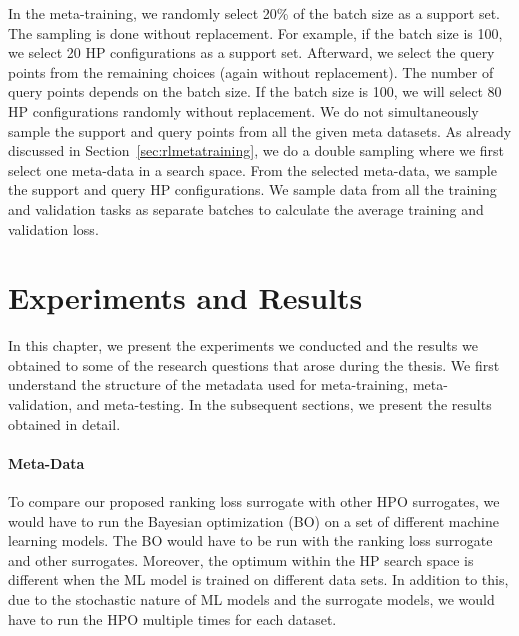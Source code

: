 \documentclass[12pt, twoside, ngerman]{report}
\begin{document}
In the meta-training, we randomly select 20\% of the batch size as a support set. The sampling is done without replacement.
For example, if the batch size is 100, we select 20 HP configurations as a support set.
Afterward,  we select the query points from the remaining choices (again without replacement). The number of query points depends on the batch size. If the batch size is 100, we will select 80 HP configurations randomly without replacement.
We do not simultaneously sample the support and query points from all the given meta datasets.
As already discussed in Section~\ref{sec:rlmetatraining}, we do a double sampling where we first select one meta-data in a search space. From the selected meta-data, we sample the support and query HP configurations.
We sample data from all the training and validation tasks as separate batches to calculate the average training and validation loss.

\chapter{Experiments and Results}
\label{chap:HPOBExplanation}

In this chapter, we present the experiments we conducted and the results we obtained to some of the research questions that arose during the thesis.
We first understand the structure of the metadata used for meta-training,  meta-validation,  and meta-testing.
In the subsequent sections, we present the results obtained in detail.

\subsubsection{Meta-Data}
To compare our proposed ranking loss surrogate with other HPO surrogates, we would have to run the Bayesian optimization (BO) on a set of different machine learning models.
The BO would have to be run with the ranking loss surrogate and other surrogates.
Moreover, the optimum within the HP search space is different when the ML model is trained on different data sets.
In addition to this, due to the stochastic nature of ML models and the surrogate models, we would have to run the HPO multiple times for each dataset.
\end{document}
